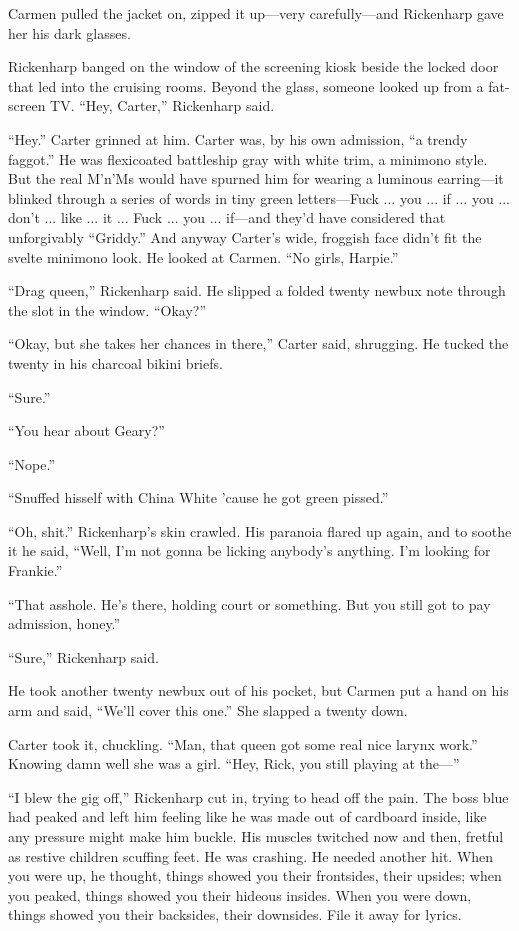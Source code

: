 Carmen pulled the jacket on, zipped it up—very carefully—and Rickenharp gave her his dark glasses.

Rickenharp banged on the window of the screening kiosk beside the locked door that led into the cruising rooms. Beyond the glass, someone looked up from a fat-screen TV. ``Hey, Carter,'' Rickenharp said.

``Hey.'' Carter grinned at him. Carter was, by his own admission, ``a trendy faggot.'' He was flexicoated battleship gray with white trim, a minimono style. But the real M'n'Ms would have spurned him for wearing a luminous earring—it blinked through a series of words in tiny green letters—Fuck ... you ... if ... you ... don't ... like ... it ... Fuck ... you ... if—and they'd have considered that unforgivably ``Griddy.'' And anyway Carter's wide, froggish face didn't fit the svelte minimono look. He looked at Carmen. ``No girls, Harpie.''

``Drag queen,'' Rickenharp said. He slipped a folded twenty newbux note through the slot in the window. ``Okay?''

``Okay, but she takes her chances in there,'' Carter said, shrugging. He tucked the twenty in his charcoal bikini briefs.

``Sure.''

``You hear about Geary?''

``Nope.''

``Snuffed hisself with China White 'cause he got green pissed.''

``Oh, shit.'' Rickenharp's skin crawled. His paranoia flared up again, and to soothe it he said, ``Well, I'm not gonna be licking anybody's anything. I'm looking for Frankie.''

``That asshole. He's there, holding court or something. But you still got to pay admission, honey.''

``Sure,'' Rickenharp said.

He took another twenty newbux out of his pocket, but Carmen put a hand on his arm and said, ``We'll cover this one.'' She slapped a twenty down.

Carter took it, chuckling. ``Man, that queen got some real nice larynx work.'' Knowing damn well she was a girl. ``Hey, Rick, you still playing at the—''

``I blew the gig off,'' Rickenharp cut in, trying to head off the pain. The boss blue had peaked and left him feeling like he was made out of cardboard inside, like any pressure might make him buckle. His muscles twitched now and then, fretful as restive children scuffing feet. He was crashing. He needed another hit. When you were up, he thought, things showed you their frontsides, their upsides; when you peaked, things showed you their hideous insides. When you were down, things showed you their backsides, their downsides. File it away for lyrics.


